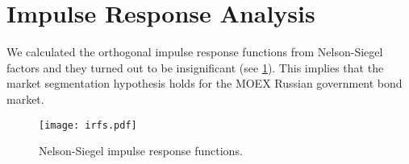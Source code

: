 \section{Impulse Response Analysis}\label{sec:IRA}
    We calculated the orthogonal impulse response functions from Nelson-Siegel factors and they turned out to be insignificant (see \cref{fig:nsirf}). This implies that the 
    market segmentation hypothesis holds for the MOEX Russian government bond market.

    \begin{figure}[!h]
        \texttt{[image: irfs.pdf]}
        \caption{Nelson-Siegel impulse response functions.}
        \label{fig:nsirf}
    \end{figure}
